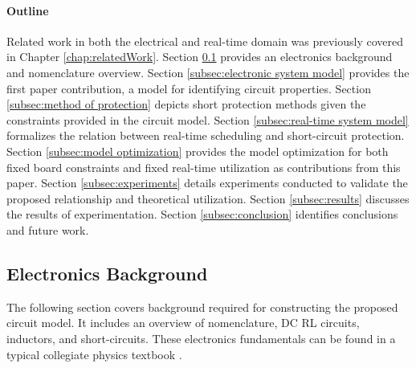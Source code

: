 \paragraph{Outline}
Related work in both the electrical and real-time domain was previously covered in Chapter \ref{chap:relatedWork}.
Section \ref{subsec:electronics background} provides an electronics background and nomenclature overview.
Section \ref{subsec:electronic system model} provides the first paper contribution, a model for identifying circuit properties.
Section \ref{subsec:method of protection} depicts short protection methods given the constraints provided in the circuit model.
Section \ref{subsec:real-time system model} formalizes the relation between real-time scheduling and short-circuit protection.
Section \ref{subsec:model optimization} provides the model optimization for both fixed board constraints and fixed real-time utilization as contributions from this paper.
Section \ref{subsec:experiments} details experiments conducted to validate the proposed relationship and theoretical utilization.
Section \ref{subsec:results} discusses the results of experimentation.
Section \ref{subsec:conclusion} identifies conclusions and future work.



\clearpage \subsection{Electronics Background}\label{subsec:electronics background}
The following section covers background required for constructing the proposed circuit model. It includes an overview of nomenclature, DC RL circuits, inductors, and short-circuits. These electronics fundamentals can be found in a typical collegiate physics textbook \cite{young_sears_2012}.

